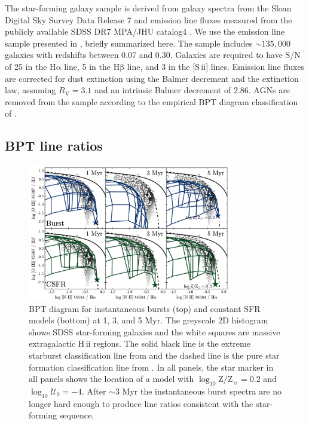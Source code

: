 \documentclass[trackchanges, twocolumn, tighten]{aastex61}
\newcommand{\logten}{\ensuremath{\log_{10}}}
\newcommand{\sii}{[S\,{\sc ii}]\xspace}
\newcommand{\ha}{\ensuremath{\mathrm{H\alpha}}}
\newcommand{\hb}{\ensuremath{\mathrm{H\beta}}}
\newcommand{\hii}{H\,{\sc ii}\xspace}
\newcommand{\logZeq}[1]{\ensuremath{\logten \mathrm{Z}/\mathrm{Z}_{\sun} = #1}}
\newcommand{\logU}{\ensuremath{\logten \mathcal{U}_0}}
\begin{document}
The star-forming galaxy sample is derived from galaxy spectra from the Sloan Digital Sky Survey Data Release 7 \citep[SDSS DR7;][]{York00, Abazajian09} and emission line fluxes measured from the publicly available SDSS DR7 MPA/JHU catalog4 \citep{Kauffmann03a, Brinchmann04, Salim07}. We use the emission line sample presented in \citet{Telford16}, briefly summarized here. The sample includes $\sim 135,000$ galaxies with redshifts between 0.07 and 0.30. Galaxies are required to have S/N of 25 in the \ha{} line, 5 in the \hb{} line, and 3 in the \sii{} lines. Emission line fluxes are corrected for dust extinction using the Balmer decrement and the \citet{Cardelli89} extinction law, assuming $R_{\mathrm{V}} = 3.1$ and an intrinsic Balmer decrement of 2.86. AGNs are removed from the sample according to the empirical BPT diagram classification of \citet{Kauffmann03b}.

\subsection{BPT line ratios}\label{sec:models:diagnostics:BPT}
\begin{figure}[ht!]
    \begin{centering}
        \includegraphics[width=0.8\textwidth]{f16.pdf}
        \caption{BPT diagram for instantaneous bursts (top) and constant SFR models (bottom) at 1, 3, and 5 Myr. The greyscale 2D histogram shows SDSS star-forming galaxies and the white squares are massive extragalactic \hii regions. The solid black line is the extreme starburst classification line from \citet{Kewley01} and the dashed line is the pure star formation classification line from \citet{Kauffmann03a}. In all panels, the star marker in all panels shows the location of a model with \logZeq{0.2} and $\logU=-4$. After $\sim3$ Myr the instantaneous burst spectra are no longer hard enough to produce line ratios consistent with the star-forming sequence.}
        \label{fig:BPTage}
    \end{centering}
\end{figure}
\end{document}
